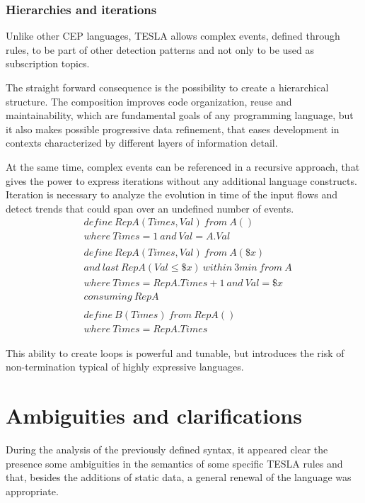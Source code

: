 \subsubsection{Hierarchies and iterations}
Unlike other CEP languages, TESLA allows complex events, defined through rules, to be part of other detection patterns and not only to be used as subscription topics.

The straight forward consequence is the possibility to create a hierarchical structure. The composition improves code organization, reuse and maintainability, which are fundamental goals of any programming language, but it also makes possible progressive data refinement, that eases development in contexts characterized by different layers of information detail.

At the same time, complex events can be referenced in a recursive approach, that gives the power to express iterations without any additional language constructs. Iteration is necessary to analyze the evolution in time of the input flows and detect trends that could span over an undefined number of events.
\begin{align*}
&define\ RepA(Times, Val)\ from\ A()\\
&where\ Times=1\ and\ Val=A.Val\\
\\
&define\ RepA(Times, Val)\ from\ A(\$x)\\
&and\ last\ RepA(Val \le \$x)\ within\ 3 min\ from\ A\\
&where\ Times=RepA.Times+1\ and\ Val = \$x\\
&consuming\ RepA\\\\
&define\ B(Times)\ from\ RepA()\\
&where\ Times=RepA.Times
\end{align*}

This ability to create loops is powerful and tunable, but introduces the risk of non-termination typical of highly expressive languages.

\section{Ambiguities and clarifications}

During the analysis of the previously defined syntax, it appeared clear the presence some ambiguities in the semantics of some specific TESLA rules and that, besides the additions of static data, a general renewal of the language was appropriate.

